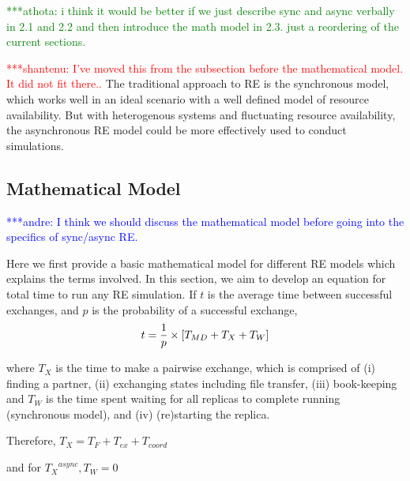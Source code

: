 \documentclass{rspublic}
\newcommand{\jhanote}[1]{ {\textcolor{red} { ***shantenu: #1 }}}
\newcommand{\alnote}[1]{ {\textcolor{blue} { ***andre: #1 }}}
\newcommand{\athotanote}[1]{ {\textcolor{green} { ***athota: #1 }}}
\newcommand{\alnote}[1]{}
\newcommand{\athotanote}[1]{}
\newcommand{\jhanote}[1]{}
\begin{document}




\athotanote{i think it would be better if we just describe sync and async verbally in 2.1 and 2.2 and then introduce the math model in 2.3. just a reordering of the current sections.}

\jhanote{I've moved this from the subsection before the mathematical
  model. It did not fit there..} The traditional approach to RE is the
synchronous model, which works well in an ideal scenario with a well
defined model of resource availability. But with heterogenous systems
and fluctuating resource availability, the asynchronous RE model could
be more effectively used to conduct simulations.

\subsection{Mathematical Model}
\alnote{I think we should discuss the mathematical model before going into the specifics of sync/async RE.}

Here we first provide a basic mathematical model for different RE
models which explains the terms involved. In this section, we aim to
develop an equation for total time to run any RE simulation. If $t$ is
the average time between successful exchanges, and $p$ is the
probability of a successful exchange,
\begin{eqnarray}
t=  {1 \over p} \times {[T_{MD} + T_{X} + T_{W}]} 
\label{eq:timebtw}
\end{eqnarray}

where $T_{X}$ is the time to make a pairwise exchange, which is comprised of (i) finding a partner, (ii) exchanging
states including file transfer, (iii) book-keeping and $T_{W}$ is the time spent waiting for all replicas to complete running (synchronous model), and (iv) (re)starting the replica.

Therefore, ${T_{X}} = {T_F + T_{ex} + T_{coord}}$ 

and for ${T_{X}}^{async}, T_W = 0$
\end{document}
